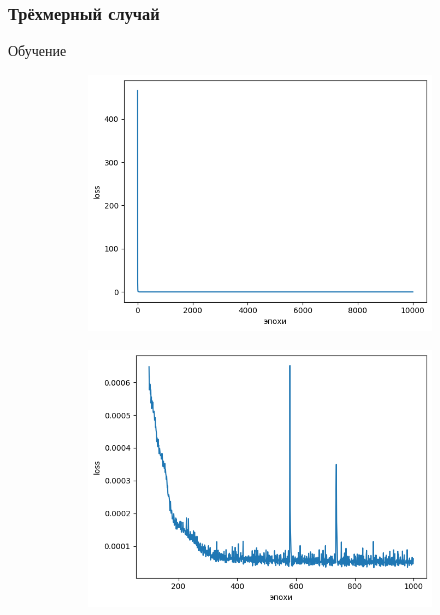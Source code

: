 \documentclass[t]{beamer}
\begin{document}
    \begin{frame}
        \frametitle{Трёхмерный случай}
        Обучение
        \begin{figure}[h]
            \begin{subfigure}{0.35\textwidth}
                \center
                \includegraphics[width=\textwidth]{../plots/ek/3-dim loss 20x4.png}
            \end{subfigure}
            \begin{subfigure}{0.35\textwidth}
                \center
                \includegraphics[width=\textwidth]{../plots/ek/3-dim loss trim20x4.png}

\end{subfigure}
\end{figure}
\end{frame}
\end{document}

